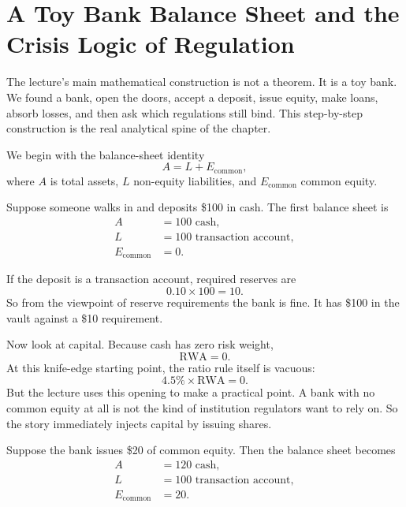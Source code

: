 \section{A Toy Bank Balance Sheet and the Crisis Logic of Regulation}

The lecture's main mathematical construction is not a theorem. It is a toy bank. We found a bank, open the doors, accept a deposit, issue equity, make loans, absorb losses, and then ask which regulations still bind. This step-by-step construction is the real analytical spine of the chapter.

We begin with the balance-sheet identity
\begin{equation}
A = L + E_{\text{common}},
\end{equation}
where \(A\) is total assets, \(L\) non-equity liabilities, and \(E_{\text{common}}\) common equity.

Suppose someone walks in and deposits \$100 in cash. The first balance sheet is
\begin{align}
A &= 100 \text{ cash}, \\
L &= 100 \text{ transaction account}, \\
E_{\text{common}} &= 0.
\end{align}

If the deposit is a transaction account, required reserves are
\begin{equation}
0.10 \times 100 = 10.
\end{equation}
So from the viewpoint of reserve requirements the bank is fine. It has \$100 in the vault against a \$10 requirement.

Now look at capital. Because cash has zero risk weight,
\begin{equation}
\text{RWA} = 0.
\end{equation}
At this knife-edge starting point, the ratio rule itself is vacuous:
\begin{equation}
4.5\% \times \text{RWA} = 0.
\end{equation}
But the lecture uses this opening to make a practical point. A bank with no common equity at all is not the kind of institution regulators want to rely on. So the story immediately injects capital by issuing shares.

Suppose the bank issues \$20 of common equity. Then the balance sheet becomes
\begin{align}
A &= 120 \text{ cash}, \\
L &= 100 \text{ transaction account}, \\
E_{\text{common}} &= 20.
\end{align}

